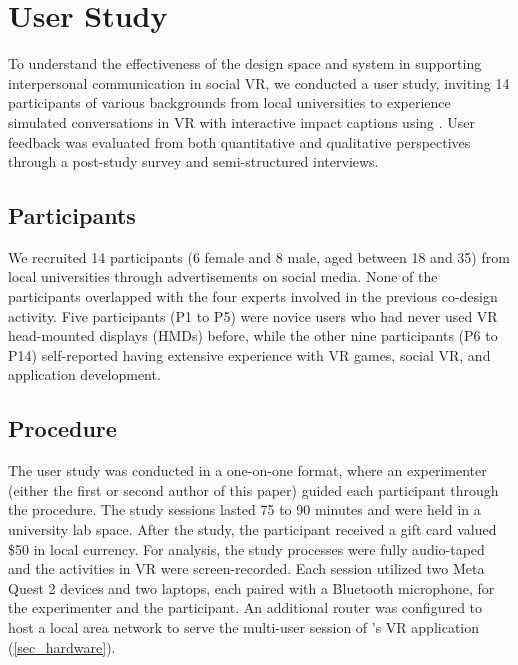 \section{User Study}
To understand the effectiveness of the design space and \system{} system in supporting interpersonal communication in social VR, we conducted a user study, inviting 14 participants of various backgrounds from local universities to experience simulated conversations in VR with interactive impact captions using \system{}. User feedback was evaluated from both quantitative and qualitative perspectives through a post-study survey and semi-structured interviews. 


\subsection{Participants}
We recruited 14 participants (6 female and 8 male, aged between 18 and 35) from local universities through advertisements on social media. 
None of the participants overlapped with the four experts involved in the previous co-design activity. 
Five participants (P1 to P5) were novice users who had never used VR head-mounted displays (HMDs) before, while the other nine participants (P6 to P14) self-reported having extensive experience with VR games, social VR, and application development.


\subsection{Procedure}
The user study was conducted in a one-on-one format, where an experimenter (either the first or second author of this paper) guided each participant through the procedure.
The study sessions lasted 75 to 90 minutes and were held in a university lab space. After the study, the participant received a gift card valued \$50 in local currency. For analysis, the study processes were fully audio-taped and the activities in VR were screen-recorded.
Each session utilized two Meta Quest 2 devices and two laptops, each paired with a Bluetooth microphone, for the experimenter and the participant. An additional router was configured to host a local area network to serve the multi-user session of \system{}'s VR application (\autoref{sec_hardware}). 

